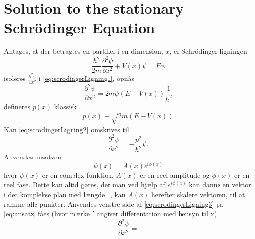 \section{Solution to the stationary Schrödinger Equation}
Antages, at der betragtes en partikel i en dimension, $x$,  er Schrödinger ligningen
\begin{equation}
    \frac{\hbar^2}{2m}\frac{\partial^2 \psi}{\partial x^2} + V(x) \psi = E \psi
    \label{eq:scrodingerLigning1}
\end{equation}
isoleres $\frac{\partial^2 \psi}{\partial x^2}$ i \cref{eq:scrodingerLigning1}, opnås
\begin{equation}
    \frac{\partial^2 \psi}{\partial x^2} = 2m\psi (E  - V(x)) \frac{1}{\hbar^2}
    \label{eq:scrodingerLigning2}
\end{equation}
defineres $p(x)$ klassisk
\begin{equation}
p(x) \equiv \sqrt{2m(E-V(x))}
\end{equation}
Kan \cref{eq:scrodingerLigning2} omskrives til
\begin{equation}
    \frac{\partial^2 \psi}{\partial x^2} = - \frac{p^2}{\hbar^2} \psi.
    \label{eq:scrodingerLigning3}
\end{equation}
Anvendes ansatzen
\begin{equation}
    \psi(x) = A(x) e^{i \phi(x)}
    \label{eq:ansatz}
\end{equation}
hvor $\psi (x)$ er en complex funktion, $A(x)$ er en reel amplitude og $\phi(x)$ er en reel fase. Dette kan altid gøres, der man ved hjælp af $e^{i \phi(x)} $ kan danne en vektor i det komplekse plan med længde 1, kan $A(x)$ herefter skalere vektoren, til at ramme alle punkter. Anvendes venstre side af \cref{eq:scrodingerLigning3} på \cref{eq:ansatz} fåes (hvor mærke $'$ angiver differentation med hensyn til x)
\begin{equation}
    \frac{\partial^2 \psi}{\partial x^2} =
    \label{eq:diff2gange}
\end{equation}
